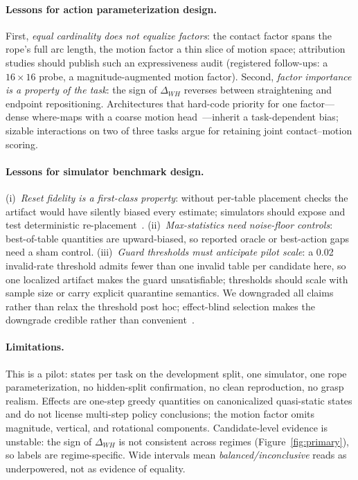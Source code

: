 \documentclass{article}
\begin{document}
\paragraph{Lessons for action parameterization design.}
First, \emph{equal cardinality does not equalize factors}: the contact
factor spans the rope's full arc length, the motion factor a thin slice of
motion space; attribution studies should publish such an expressiveness
audit (registered follow-ups: a $16{\times}16$ probe, a
magnitude-augmented motion factor). Second, \emph{factor
importance is a property of the task}: the sign of $\Delta_{WH}$ reverses
between straightening and endpoint repositioning. Architectures that
hard-code priority for one factor---dense where-maps with a coarse motion
head~\citep{mo2021where2act,wu2023foresightful,zhou2023hacman}---inherit a
task-dependent bias; sizable interactions on two of three tasks argue for
retaining joint contact--motion scoring.

\paragraph{Lessons for simulator benchmark design.}
(i)~\emph{Reset fidelity is a first-class property}: without per-table
placement checks the artifact would have silently biased every estimate;
simulators should expose and test deterministic
re-placement~\citep{lin2021softgym,cao2026dlolab}.
(ii)~\emph{Max-statistics need noise-floor controls}: best-of-table
quantities are upward-biased, so reported oracle or best-action gaps need a
sham control. (iii)~\emph{Guard thresholds must anticipate pilot scale}: a
0.02 invalid-rate threshold admits fewer than one invalid table per
candidate here, so one localized artifact makes the guard unsatisfiable;
thresholds should scale with sample size or carry explicit quarantine
semantics. We downgraded all claims rather than relax the threshold post
hoc; effect-blind selection makes the downgrade credible rather than
convenient~\citep{nosek2018preregistration,agarwal2021statistical}.

\paragraph{Limitations.}
This is a pilot: \nstatespertask{} states per task on the development
split, one simulator, one rope parameterization, no hidden-split
confirmation, no clean reproduction, no grasp realism. Effects are one-step
greedy quantities on canonicalized quasi-static states and do not license
multi-step policy conclusions; the motion factor omits magnitude, vertical,
and rotational components. Candidate-level evidence is unstable: the sign
of $\Delta_{WH}$ is not consistent across regimes
(Figure~\ref{fig:primary}), so labels are regime-specific. Wide intervals
mean \emph{balanced/inconclusive} reads as underpowered, not as evidence of
equality.
\end{document}
